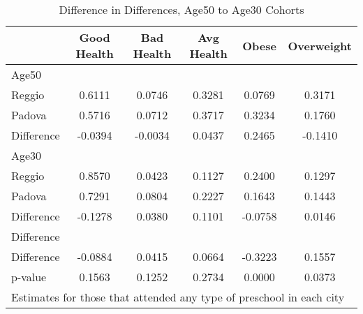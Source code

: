 \begin{table}[htbp]\centering
\caption{Difference in Differences, Age50 to Age30 Cohorts}
\begin{tabular}{l*{5}{c}}
\hline\hline
            & Good Health&  Bad Health&  Avg Health&       Obese&  Overweight\\
\hline
Age50       &            &            &            &            &            \\
Reggio      &      0.6111&      0.0746&      0.3281&      0.0769&      0.3171\\
Padova      &      0.5716&      0.0712&      0.3717&      0.3234&      0.1760\\
Difference  &     -0.0394&     -0.0034&      0.0437&      0.2465&     -0.1410\\
\hline
Age30       &            &            &            &            &            \\
Reggio      &      0.8570&      0.0423&      0.1127&      0.2400&      0.1297\\
Padova      &      0.7291&      0.0804&      0.2227&      0.1643&      0.1443\\
Difference  &     -0.1278&      0.0380&      0.1101&     -0.0758&      0.0146\\
\hline
Difference  &            &            &            &            &            \\
Difference  &     -0.0884&      0.0415&      0.0664&     -0.3223&      0.1557\\
p-value     &      0.1563&      0.1252&      0.2734&      0.0000&      0.0373\\
\hline\hline
\multicolumn{6}{l}{\footnotesize Estimates for those that attended any type of preschool in each city}\\
\end{tabular}
\end{table}
